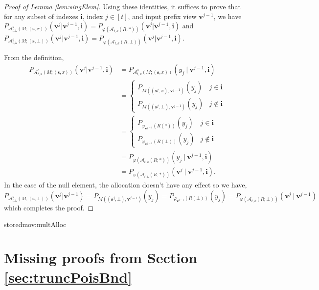 \documentclass{article}
\newcommand{\showstored}[1]{\csname stored#1\endcsname}
\theoremstyle{plain}
\theoremstyle{definition}
\newcommand{\out}{y}
\newcommand{\alg}{M}
\newcommand{\rand}{R}
\newcommand{\dataset}{\boldsymbol{s}}
\newcommand{\view}{\boldsymbol{v}}
\newcommand{\allocFunc}[3]{\mathcal{A}_{#1}\left(#2; #3\right)}
\begin{document}
\begin{proof}[Proof of Lemma \ref{lem:singElem}]
    Using these identities, it suffices to prove that for any subset of indexes $\boldsymbol{i}$, index $j \in [t]$, and input prefix view $\view^{j-1}$, we have $P_{\mathcal{A}_{t, k}^{a}(\alg; (\dataset, x))}(\view^{j} \vert \view^{j-1}, \boldsymbol{i}) = P_{\varphi(\allocFunc{t, k}{\rand}{*})}(\view^{j} \vert \view^{j-1}, \boldsymbol{i})$ and $P_{\mathcal{A}_{t, k}^{a}(\alg; (\dataset, \bot))}(\view^{j} \vert \view^{j-1}, \boldsymbol{i}) = P_{\varphi(\allocFunc{t, k}{\rand}{\bot})}(\view^{j} \vert \view^{j-1}, \boldsymbol{i})$.

    From the definition,
    \begin{align*}
        P_{\mathcal{A}_{t, k}^{a}(\alg; (\dataset, x))}(\view^{j} \vert \view^{j-1}, \boldsymbol{i}) & = P_{\mathcal{A}_{t, k}^{a}(\alg; (\dataset, x))}(\out_{j}~\vert~\view^{j-1}, \boldsymbol{i})
        \\ & = \begin{cases}
            P_{\alg((\dataset^{j}, x), \view^{j-1})}(\out_{j}) & j \in \boldsymbol{i} \\
            P_{\alg((\dataset^{j}, \bot), \view^{j-1})}(\out_{j}) & j \notin \boldsymbol{i}          
        \end{cases}
        \\ & = \begin{cases}
            P_{\varphi_{\view^{j-1}}(\rand(*))}(\out_{j}) & j \in \boldsymbol{i} \\
            P_{\varphi_{\view^{j-1}}(\rand(\bot))}(\out_{j}) & j \notin \boldsymbol{i}
        \end{cases}
        \\ & = P_{\varphi(\allocFunc{t, k}{\rand}{*})}(\out_{j}~\vert~\view^{j-1}, \boldsymbol{i})
        \\ & = P_{\varphi(\allocFunc{t, k}{\rand}{*})}(\view^{j}~\vert~\view^{j-1}, \boldsymbol{i}).
    \end{align*}
    In the case of the null element, the allocation doesn't have any effect so we have,
    \[
        P_{\mathcal{A}_{t, k}^{a}(\alg; (\dataset, \bot))}(\view^{j} \vert \view^{j-1}) = P_{\alg((\dataset^{j}, \bot), \view^{j-1})}(\out_{j}) = P_{\varphi_{\view^{j-1}}(\rand(\bot))}(\out_{j}) = P_{\varphi(\allocFunc{t, k}{\rand}{\bot})}(\view^{j}~\vert~\view^{j-1})
    \]
    which completes the proof.
\end{proof}

\showstored{mov:multAlloc}

\section{Missing proofs from Section \ref{sec:truncPoisBnd}}\label{apd:truncPoisBnd}
\end{document}
